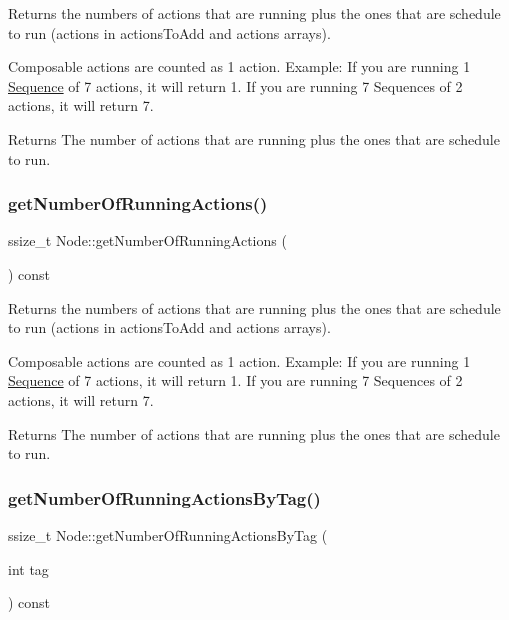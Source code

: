 Returns the numbers of actions that are running plus the ones that are schedule to run (actions in actions\+To\+Add and actions arrays).

Composable actions are counted as 1 action. Example\+: If you are running 1 \hyperlink{classSequence}{Sequence} of 7 actions, it will return 1. If you are running 7 Sequences of 2 actions, it will return 7.

\begin{DoxyReturn}{Returns}
The number of actions that are running plus the ones that are schedule to run. 
\end{DoxyReturn}
\mbox{\label{classNode_a576446fef9c35a1a06535eb8949df2f3}} 
\subsubsection{\texorpdfstring{get\+Number\+Of\+Running\+Actions()}{getNumberOfRunningActions()}\hspace{0.1cm}{\footnotesize\ttfamily [2/2]}}
{\footnotesize\ttfamily ssize\+\_\+t Node\+::get\+Number\+Of\+Running\+Actions (\begin{DoxyParamCaption}{ }\end{DoxyParamCaption}) const}

Returns the numbers of actions that are running plus the ones that are schedule to run (actions in actions\+To\+Add and actions arrays).

Composable actions are counted as 1 action. Example\+: If you are running 1 \hyperlink{classSequence}{Sequence} of 7 actions, it will return 1. If you are running 7 Sequences of 2 actions, it will return 7.

\begin{DoxyReturn}{Returns}
The number of actions that are running plus the ones that are schedule to run. 
\end{DoxyReturn}
\mbox{\label{classNode_a79f360d4398f3748527a281513364d94}} 
\subsubsection{\texorpdfstring{get\+Number\+Of\+Running\+Actions\+By\+Tag()}{getNumberOfRunningActionsByTag()}}
{\footnotesize\ttfamily ssize\+\_\+t Node\+::get\+Number\+Of\+Running\+Actions\+By\+Tag (\begin{DoxyParamCaption}\item[{int}]{tag }\end{DoxyParamCaption}) const}


